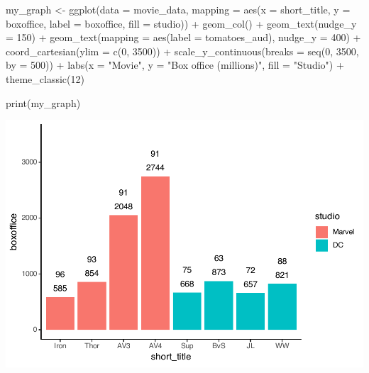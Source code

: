\documentclass[
]{krantz}
\makeatletter
\newenvironment{Shaded}{\begin{snugshade}}{\end{snugshade}}
\newcommand{\AttributeTok}[1]{\textcolor[rgb]{0.61,0.61,0.61}{#1}}
\newcommand{\DecValTok}[1]{\textcolor[rgb]{0.06,0.06,0.06}{#1}}
\newcommand{\FunctionTok}[1]{\textcolor[rgb]{0,0,0}{#1}}
\newcommand{\NormalTok}[1]{#1}
\newcommand{\OtherTok}[1]{\textcolor[rgb]{0.37,0.37,0.37}{#1}}
\newcommand{\SpecialCharTok}[1]{\textcolor[rgb]{0,0,0}{#1}}
\newcommand{\StringTok}[1]{\textcolor[rgb]{0.5,0.5,0.5}{#1}}
\newenvironment{kframe}{%
\medskip{}
\setlength{\fboxsep}{.8em}
 \def\at@end@of@kframe{}%
 \ifinner\ifhmode%
  \def\at@end@of@kframe{\end{minipage}}%
  \begin{minipage}{\columnwidth}%
 \fi\fi%
 \def\FrameCommand##1{\hskip\@totalleftmargin \hskip-\fboxsep
 \colorbox{shadecolor}{##1}\hskip-\fboxsep
     \hskip-\linewidth \hskip-\@totalleftmargin \hskip\columnwidth}%
 \MakeFramed {\advance\hsize-\width
   \@totalleftmargin\z@ \linewidth\hsize
   \@setminipage}}%
 {\par\unskip\endMakeFramed%
 \at@end@of@kframe}
\renewenvironment{Shaded}{\begin{kframe}}{\end{kframe}}
\makeatother
\begin{document}
\begin{Shaded}
\begin{Highlighting}[]
\NormalTok{my\_graph }\OtherTok{\textless{}{-}} \FunctionTok{ggplot}\NormalTok{(}\AttributeTok{data =}\NormalTok{ movie\_data,}
           \AttributeTok{mapping =} \FunctionTok{aes}\NormalTok{(}\AttributeTok{x =}\NormalTok{ short\_title,}
                         \AttributeTok{y =}\NormalTok{ boxoffice,}
                         \AttributeTok{label =}\NormalTok{ boxoffice, }
                         \AttributeTok{fill =}\NormalTok{ studio)) }\SpecialCharTok{+}
  \FunctionTok{geom\_col}\NormalTok{() }\SpecialCharTok{+}
  \FunctionTok{geom\_text}\NormalTok{(}\AttributeTok{nudge\_y =} \DecValTok{150}\NormalTok{)  }\SpecialCharTok{+}
  \FunctionTok{geom\_text}\NormalTok{(}\AttributeTok{mapping =} \FunctionTok{aes}\NormalTok{(}\AttributeTok{label =}\NormalTok{ tomatoes\_aud), }
            \AttributeTok{nudge\_y =} \DecValTok{400}\NormalTok{) }\SpecialCharTok{+}
  \FunctionTok{coord\_cartesian}\NormalTok{(}\AttributeTok{ylim =} \FunctionTok{c}\NormalTok{(}\DecValTok{0}\NormalTok{, }\DecValTok{3500}\NormalTok{)) }\SpecialCharTok{+}
  \FunctionTok{scale\_y\_continuous}\NormalTok{(}\AttributeTok{breaks =} \FunctionTok{seq}\NormalTok{(}\DecValTok{0}\NormalTok{, }\DecValTok{3500}\NormalTok{, }\AttributeTok{by =} \DecValTok{500}\NormalTok{)) }\SpecialCharTok{+}
  \FunctionTok{labs}\NormalTok{(}\AttributeTok{x =} \StringTok{"Movie"}\NormalTok{,}
       \AttributeTok{y =} \StringTok{"Box office (millions)"}\NormalTok{,}
       \AttributeTok{fill =} \StringTok{"Studio"}\NormalTok{) }\SpecialCharTok{+}
  \FunctionTok{theme\_classic}\NormalTok{(}\DecValTok{12}\NormalTok{)}

\FunctionTok{print}\NormalTok{(my\_graph)}
\end{Highlighting}
\end{Shaded}

\includegraphics[width=0.65\linewidth]{bookdown_files/figure-latex/unnamed-chunk-122-1}
\end{document}
